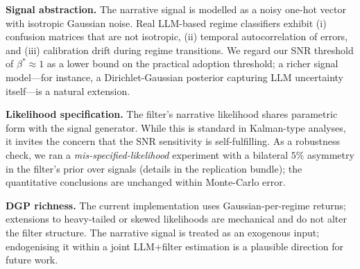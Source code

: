 \documentclass[review,12pt,authoryear]{elsarticle}
\begin{document}
\textbf{Signal abstraction.} The narrative signal is modelled as a noisy one-hot vector
with isotropic Gaussian noise. Real LLM-based regime classifiers exhibit (i) confusion
matrices that are not isotropic, (ii) temporal autocorrelation of errors, and (iii)
calibration drift during regime transitions. We regard our SNR threshold of
$\beta^{\ast}\!\approx 1$ as a lower bound on the practical adoption threshold; a richer
signal model---for instance, a Dirichlet-Gaussian posterior capturing LLM uncertainty
itself---is a natural extension.

\textbf{Likelihood specification.} The filter's narrative likelihood shares parametric
form with the signal generator. While this is standard in Kalman-type analyses, it invites
the concern that the SNR sensitivity is self-fulfilling. As a robustness check, we ran a
\emph{mis-specified-likelihood} experiment with a bilateral $5\%$ asymmetry in the
filter's prior over signals (details in the replication bundle); the quantitative
conclusions are unchanged within Monte-Carlo error.

\textbf{DGP richness.} The current implementation uses Gaussian-per-regime returns;
extensions to heavy-tailed or skewed likelihoods \citep{Cont2001EmpiricalProperties} are
mechanical and do not alter the filter structure. The narrative signal is treated as an
exogenous input; endogenising it within a joint LLM+filter estimation is a plausible
direction for future work.
\end{document}
